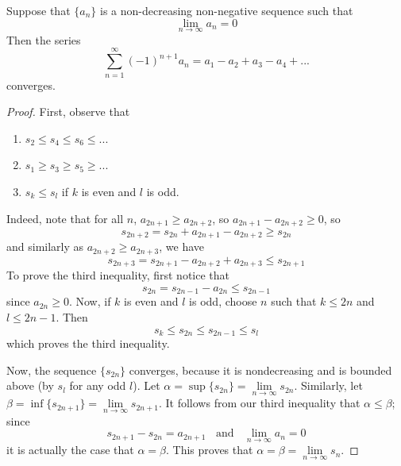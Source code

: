 \documentclass[12pt, a4paper, oneside, openright, titlepage]{book}
\begin{document}
\begin{namthm}\label{thmname:alttest}
    Suppose that $\{a_n\}$ is a non-decreasing non-negative sequence such that \begin{equation*}
        \lim\limits_{n\rightarrow \infty} a_n = 0
    \end{equation*}
    Then the series \begin{equation*}
        \sum\limits_{n=1}^{\infty}(-1)^{n+1}a_n = a_1-a_2+a_3-a_4+...
    \end{equation*}
    converges.
\end{namthm}
\begin{proof}
    First, observe that \begin{enumerate}
        \item $s_2 \leq s_4 \leq s_6 \leq ...$
        \item $s_1 \geq s_3 \geq s_5 \geq ...$ 
        \item $s_k\leq s_l$ if $k$ is even and $l$ is odd.
    \end{enumerate}
    Indeed, note that for all $n$, $a_{2n+1} \geq a_{2n+2}$, so $a_{2n+1} - a_{2n+2} \geq 0$, so \begin{equation*}
        s_{2n+2} = s_{2n} + a_{2n+1} - a_{2n+2} \geq s_{2n}
    \end{equation*}
    and similarly as $a_{2n+2} \geq a_{2n+3}$, we have \begin{equation*}
        s_{2n+3} = s_{2n+1} -a_{2n+2}+a_{2n+3} \leq s_{2n+1}
    \end{equation*}
    To prove the third inequality, first notice that \begin{equation*}
        s_{2n} = s_{2n-1} - a_{2n} \leq s_{2n-1}
    \end{equation*}
    since $a_{2n} \geq 0$. Now, if $k$ is even and $l$ is odd, choose $n$ such that $k\leq 2n$ and $l \leq 2n-1$. Then \begin{equation*}
        s_k \leq s_{2n} \leq s_{2n-1} \leq s_l
    \end{equation*}
    which proves the third inequality.

    Now, the sequence $\{s_{2n}\}$ converges, because it is nondecreasing and is bounded above (by $s_l$ for any odd $l$). Let $\alpha = \sup\{s_{2n}\} = \lim\limits_{n\rightarrow\infty} s_{2n}$. Similarly, let $\beta = \inf\{s_{2n+1}\} = \lim\limits_{n\rightarrow \infty}s_{2n+1}$. It follows from our third inequality that $\alpha \leq \beta$; since \begin{equation*}
        s_{2n+1}-s_{2n} = a_{2n+1}\;\;\text{ and }\;\;\lim\limits_{n\rightarrow \infty}a_n = 0
    \end{equation*}
    it is actually the case that $\alpha = \beta$. This proves that $\alpha = \beta = \lim\limits_{n\rightarrow \infty} s_n$.
\end{proof}
\end{document}

